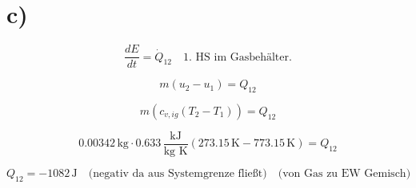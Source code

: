 

\section*{c)}

\[
\frac{dE}{dt} = \dot{Q}_{12} \quad \text{1. HS im Gasbehälter.}
\]

\[
m (u_2 - u_1) = Q_{12}
\]

\[
m \left( c_{v,ig} (T_2 - T_1) \right) = Q_{12}
\]

\[
0.00342 \, \text{kg} \cdot 0.633 \, \frac{\text{kJ}}{\text{kg K}} (273.15 \, \text{K} - 773.15 \, \text{K}) = Q_{12}
\]

\[
Q_{12} = -1082 \, \text{J} \quad \text{(negativ da aus Systemgrenze fließt)} \quad \text{(von Gas zu EW Gemisch)}
\]